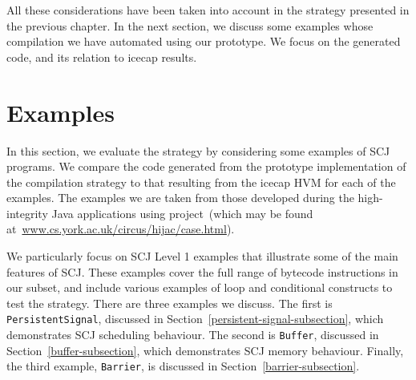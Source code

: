 All these considerations have been taken into account in the strategy
presented in the previous chapter.
In the next section, we discuss some examples whose compilation we
have automated using our prototype. 
We focus on the generated code, and its relation to icecap results.


\section{Examples}
\label{examples-section}

In this section, we evaluate the strategy by considering some examples
of SCJ programs.
We compare the code generated from the prototype implementation of the
compilation strategy to that resulting from the icecap HVM for each of
the examples.
The examples we  are taken from those developed
during the high-integrity Java applications using \Circus{}
project~(which may be found
at~\url{www.cs.york.ac.uk/circus/hijac/case.html}).

We particularly focus on SCJ Level 1 examples that illustrate some of
the main features of SCJ.
These examples cover the full range of bytecode instructions in our
subset, and include various examples of loop and conditional
constructs to test the strategy.
There are three examples we discuss.
The first is \texttt{PersistentSignal}, discussed in
Section~\ref{persistent-signal-subsection}, which demonstrates SCJ
scheduling behaviour.
The second is \texttt{Buffer}, discussed in
Section~\ref{buffer-subsection}, which demonstrates SCJ memory
behaviour.
Finally, the third example, \texttt{Barrier},  is discussed in
Section~\ref{barrier-subsection}.

